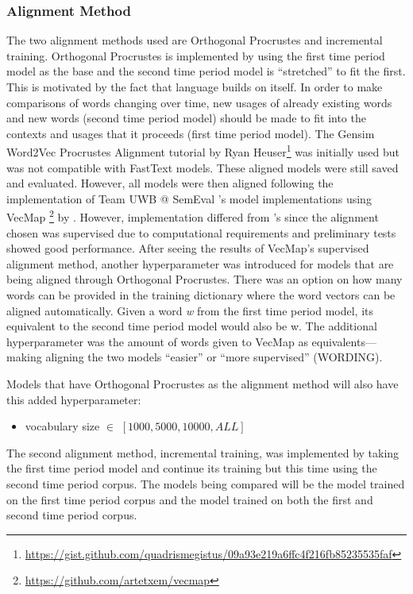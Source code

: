 \subsubsection{Alignment Method}
The two alignment methods used are Orthogonal Procrustes and incremental training. Orthogonal Procrustes is implemented by using the first time period model as the base and the second time period model is “stretched” to fit the first. This is motivated by the fact that language builds on itself. In order to make comparisons of words changing over time, new usages of already existing words and new words (second time period model) should be made to fit into the contexts and usages that it proceeds (first time period model). The Gensim Word2Vec Procrustes Alignment tutorial by Ryan Heuser\footnote{\url{https://gist.github.com/quadrismegistus/09a93e219a6ffc4f216fb85235535faf}}  was initially used but was not compatible with FastText models. These aligned models were still saved and evaluated. However, all models were then aligned following the implementation of Team UWB @ SemEval \citet{prazak-etal-2020-uwb}’s model implementations using VecMap \footnote{\url{https://github.com/artetxem/vecmap}} by \citet{artetxe2018generalizing}. However, implementation differed from \citet{prazak-etal-2020-uwb}’s since the alignment chosen was supervised due to computational requirements and preliminary tests showed good performance. After seeing the results of VecMap’s supervised alignment method, another hyperparameter was introduced for models that are being aligned through Orthogonal Procrustes. There was an option on how many words can be provided in the training dictionary where the word vectors can be aligned automatically. Given a word \emph{w} from the first time period model, its equivalent to the second time period model would also be w. The additional hyperparameter was the amount of words given to VecMap as equivalents—making aligning the two models “easier” or “more supervised” (WORDING).

Models that have Orthogonal Procrustes as the alignment method will also have this added hyperparameter:
\begin{itemize}
    \item vocabulary size $\in$ $[1000, 5000, 10000, ALL]$
\end{itemize}%

The second alignment method, incremental training, was implemented by taking the first time period model and continue its training but this time using the second time period corpus. The models being compared will be the model trained on the first time period corpus and the model trained on both the first and second time period corpus.

